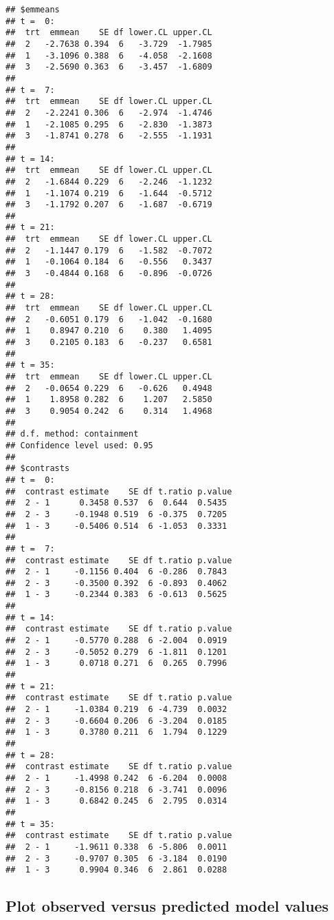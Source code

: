 \documentclass[]{book}
\begin{document}
\begin{verbatim}
## $emmeans
## t =  0:
##  trt  emmean    SE df lower.CL upper.CL
##  2   -2.7638 0.394  6   -3.729  -1.7985
##  1   -3.1096 0.388  6   -4.058  -2.1608
##  3   -2.5690 0.363  6   -3.457  -1.6809
## 
## t =  7:
##  trt  emmean    SE df lower.CL upper.CL
##  2   -2.2241 0.306  6   -2.974  -1.4746
##  1   -2.1085 0.295  6   -2.830  -1.3873
##  3   -1.8741 0.278  6   -2.555  -1.1931
## 
## t = 14:
##  trt  emmean    SE df lower.CL upper.CL
##  2   -1.6844 0.229  6   -2.246  -1.1232
##  1   -1.1074 0.219  6   -1.644  -0.5712
##  3   -1.1792 0.207  6   -1.687  -0.6719
## 
## t = 21:
##  trt  emmean    SE df lower.CL upper.CL
##  2   -1.1447 0.179  6   -1.582  -0.7072
##  1   -0.1064 0.184  6   -0.556   0.3437
##  3   -0.4844 0.168  6   -0.896  -0.0726
## 
## t = 28:
##  trt  emmean    SE df lower.CL upper.CL
##  2   -0.6051 0.179  6   -1.042  -0.1680
##  1    0.8947 0.210  6    0.380   1.4095
##  3    0.2105 0.183  6   -0.237   0.6581
## 
## t = 35:
##  trt  emmean    SE df lower.CL upper.CL
##  2   -0.0654 0.229  6   -0.626   0.4948
##  1    1.8958 0.282  6    1.207   2.5850
##  3    0.9054 0.242  6    0.314   1.4968
## 
## d.f. method: containment 
## Confidence level used: 0.95 
## 
## $contrasts
## t =  0:
##  contrast estimate    SE df t.ratio p.value
##  2 - 1      0.3458 0.537  6  0.644  0.5435 
##  2 - 3     -0.1948 0.519  6 -0.375  0.7205 
##  1 - 3     -0.5406 0.514  6 -1.053  0.3331 
## 
## t =  7:
##  contrast estimate    SE df t.ratio p.value
##  2 - 1     -0.1156 0.404  6 -0.286  0.7843 
##  2 - 3     -0.3500 0.392  6 -0.893  0.4062 
##  1 - 3     -0.2344 0.383  6 -0.613  0.5625 
## 
## t = 14:
##  contrast estimate    SE df t.ratio p.value
##  2 - 1     -0.5770 0.288  6 -2.004  0.0919 
##  2 - 3     -0.5052 0.279  6 -1.811  0.1201 
##  1 - 3      0.0718 0.271  6  0.265  0.7996 
## 
## t = 21:
##  contrast estimate    SE df t.ratio p.value
##  2 - 1     -1.0384 0.219  6 -4.739  0.0032 
##  2 - 3     -0.6604 0.206  6 -3.204  0.0185 
##  1 - 3      0.3780 0.211  6  1.794  0.1229 
## 
## t = 28:
##  contrast estimate    SE df t.ratio p.value
##  2 - 1     -1.4998 0.242  6 -6.204  0.0008 
##  2 - 3     -0.8156 0.218  6 -3.741  0.0096 
##  1 - 3      0.6842 0.245  6  2.795  0.0314 
## 
## t = 35:
##  contrast estimate    SE df t.ratio p.value
##  2 - 1     -1.9611 0.338  6 -5.806  0.0011 
##  2 - 3     -0.9707 0.305  6 -3.184  0.0190 
##  1 - 3      0.9904 0.346  6  2.861  0.0288
\end{verbatim}

\hypertarget{plot-observed-versus-predicted-model-values}{%
\subsection{Plot observed versus predicted model values}\label{plot-observed-versus-predicted-model-values}}
\end{document}
